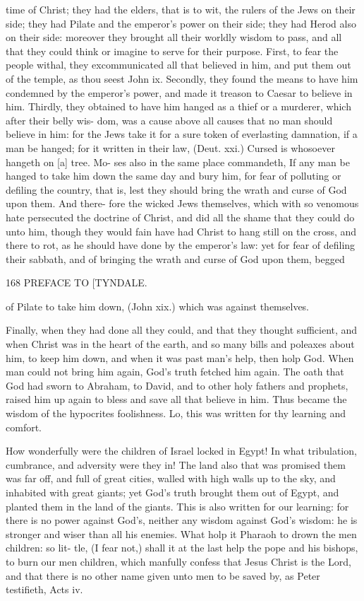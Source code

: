 \documentclass{custom}
\begin{document}
time of Christ; they had the elders, that is to
wit, the rulers of the Jews on their side; they 
had Pilate and the emperor's power on their side; 
they had Herod also on their side: moreover 
they brought all their worldly wisdom to pass, and 
all that they could think or imagine to serve for 
their purpose. First, to fear the people withal,
they excommunicated all that believed in him,
and put them out of the temple, as thou seest 
John ix. Secondly, they found the means to 
have him condemned by the emperor's power, and 
made it treason to Caesar to believe in him. 
Thirdly, they obtained to have him hanged as a 
thief or a murderer, which after their belly wis- 
dom, was a cause above all causes that no man 
should believe in him: for the Jews take it for a 
sure token of everlasting damnation, if a man be 
hanged; for it written in their law, (Deut. xxi.) 
Cursed is whosoever hangeth on [a] tree. Mo- 
ses also in the same place commandeth, If any 
man be hanged to take him down the same day 
and bury him, for fear of polluting or defiling 
the country, that is, lest they should bring the 
wrath and curse of God upon them. And there- 
fore the wicked Jews themselves, which with so 
venomous hate persecuted the doctrine of Christ, 
and did all the shame that they could do unto 
him, though they would fain have had Christ to 
hang still on the cross, and there to rot, as he 
should have done by the emperor's law: yet for 
fear of defiling their sabbath, and of bringing 
the wrath and curse of God upon them, begged 


168 PREFACE TO [TYNDALE. 

of Pilate to take him down, (John xix.) which 
was against themselves. 

Finally, when they had done all they could, and 
that they thought sufficient, and when Christ was 
in the heart of the earth, and so many bills and 
poleaxes about him, to keep him down, and when 
it was past man's help, then holp God. When 
man could not bring him again, God's truth 
fetched him again. The oath that God had 
sworn to Abraham, to David, and to other holy 
fathers and prophets, raised him up again to bless 
and save all that believe in him. Thus became 
the wisdom of the hypocrites foolishness. Lo, this 
was written for thy learning and comfort.

How wonderfully were the children of Israel 
locked in Egypt! In what tribulation, cumbrance, 
and adversity were they in! The land also that 
was promised them was far off, and full of great 
cities, walled with high walls up to the sky, and 
inhabited with great giants; yet God's truth 
brought them out of Egypt, and planted them in 
the land of the giants. This is also written for 
our learning: for there is no power against God's,
neither any wisdom against God's wisdom: he is 
stronger and wiser than all his enemies. What 
holp it Pharaoh to drown the men children: so lit-
tle, (I fear not,) shall it at the last help the pope 
and his bishops, to burn our men children, 
which manfully confess that Jesus Christ is the 
Lord, and that there is no other name given unto 
men to be saved by, as Peter testifieth, Acts iv. 
\end{document}
